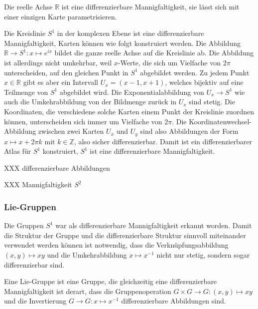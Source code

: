 \begin{beispiel}
Die reelle Achse $\mathbb{R}$ ist eine differenzierbare Mannigfaltigkeit,
sie lässt sich mit einer einzigen Karte parametrisieren.
\end{beispiel}

\begin{beispiel}
Die Kreislinie $S^1$ in der komplexen Ebene ist eine differenzierbare
Mannigfaltigkeit, Karten können wie folgt konstruiert werden.
Die Abbildung $\mathbb{R}\to S^1: x\mapsto e^{ix}$ bildet die ganze
reelle Achse auf die Kreislinie ab.
Die Abbildung ist allerdings nicht umkehrbar, weil $x$-Werte, die sich
um Vielfache von $2\pi$ unterscheiden, auf den gleichen Punkt in $S^1$
abgebildet werden.
Zu jedem Punkt $x\in\mathbb{R}$ gibt es aber ein Intervall
$U_x=(x-1,x+1)$, welches bijektiv auf eine Teilmenge von $S^1$
abgebildet wird.
Die Exponentialabbildung von $U_x\to S^1$ wie auch die Umkehrabbildung
von der Bildmenge zurück in $U_x$ sind stetig.
Die Koordinaten, die verschiedene solche Karten einem Punkt der Kreislinie
zuordnen können, unterscheiden sich immer um Vielfache von $2\pi$.
Die Koordinatenwechsel-Abbildung zwischen zwei Karten $U_x$ und $U_y$
sind also Abbildungen der Form $x\mapsto x+2\pi k$ mit $k\in\mathbb{Z}$,
also sicher differenzierbar.
Damit ist ein differenzierbarer Atlas für $S^1$ konstruiert, $S^1$
ist eine differenzierbare Mannigfaltigkeit.
\end{beispiel}

XXX differenzierbare Abbildungen

XXX Mannigfaltigkeit $S^2$

%
%
\subsubsection{Lie-Gruppen}
Die Gruppen $S^1$ war als differenzierbare Mannigfaltigkeit erkannt
worden.
Damit die Struktur der Gruppe und die differenzierbare Struktur sinnvoll
miteinander verwendet werden können ist notwendig, dass die
Verknüpfungsabbildung $(x,y)\mapsto xy$ und die Umkehrabbildung
$x\mapsto x^{-1}$ nicht nur stetig, sondern sogar differenzierbar sind.

\begin{definition}
\label{buch:gruppen:gruppe:def:liegruppe}
Eine Lie-Gruppe ist eine Gruppe, die gleichzeitig eine differenzierbare
Mannigfaltigkeit ist derart, dass die Gruppenoperation
$G\times G\to G:(x,y)\mapsto xy$
und die Invertierung $G\to G: x\mapsto x^{-1}$ differenzierbare Abbildungen
sind.
\end{definition}

